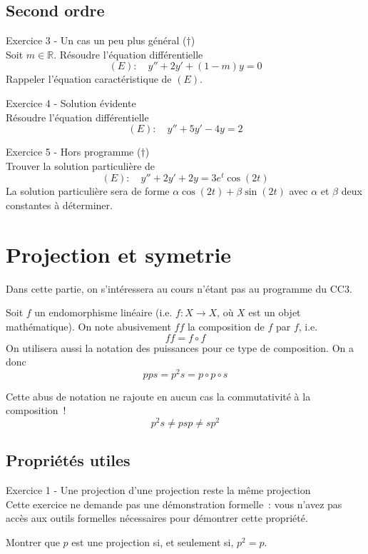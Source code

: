 \documentclass[a4paper, titlepage]{article}
\newenvironment{lititle}%
{\vspace{7mm}\LobsterTwo \large}%
{\\}
\begin{document}
	\subsection{Second ordre}
	\begin{lititle}
		Exercice 3 - Un cas un peu plus général ($\dagger$)
	\end{lititle}
	Soit $m\in\mathbb{R}$. Résoudre l'équation différentielle
	$$ (E):\quad y''+2y'+(1-m)y=0 $$
	Rappeler l'équation caractéristique de $(E)$.

	\begin{lititle}
		Exercice 4 - Solution évidente
	\end{lititle}
	Résoudre l'équation différentielle
	$$ (E):\quad y''+5y'-4y = 2 $$

	\begin{lititle}
		Exercice 5 - Hors programme ($\dagger$)
	\end{lititle}
	Trouver la solution particulière de
	$$ (E):\quad y''+2y'+2y=3e^t\cos(2t) $$
	La solution particulière sera de forme $\alpha\cos(2t)+\beta\sin(2t)$ avec $\alpha$ et $\beta$ deux constantes à déterminer.
	\section{Projection et symetrie}
	Dans cette partie, on s'intéressera au cours n'étant pas au programme du CC3.

	Soit $f$ un endomorphisme linéaire (i.e. $f: X\to X$, où $X$ est un objet mathématique). On note abusivement $ff$ la composition de $f$ par $f$, i.e.
	$$  ff = f\circ f $$
	On utilisera aussi la notation des puissances pour ce type de composition. On a donc
	$$ pps = p^2 s = p\circ p\circ s $$
	\begin{warn}
		Cette abus de notation ne rajoute en aucun cas la commutativité à la composition~!
		$$ p^2 s \neq psp \neq sp^2 $$
	\end{warn}
	\subsection{Propriétés utiles}
	\begin{lititle}
		Exercice 1 - Une projection d'une projection reste la même projection
	\end{lititle}
	Cette exercice ne demande pas une démonstration formelle~: vous n'avez pas accès aux outils formelles nécessaires pour démontrer cette propriété.

	Montrer que $p$ est une projection si, et seulement si, $p^2=p$.
\end{document}

